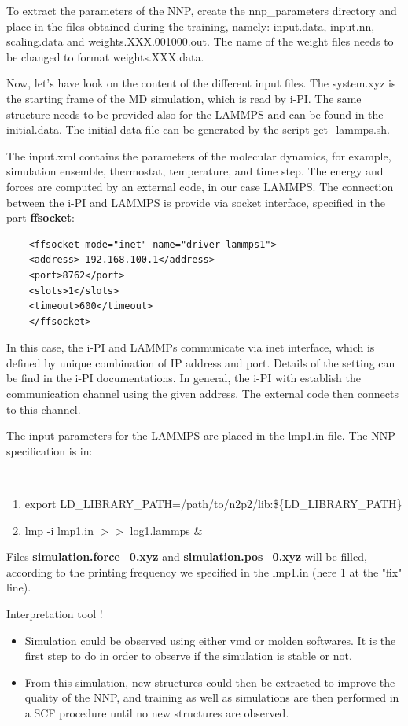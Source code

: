 \documentclass[12pt]{article}
\begin{document}
To extract the parameters of the NNP, create the nnp\_parameters directory and place in the files obtained during the training, namely: input.data, input.nn, scaling.data and weights.XXX.001000.out. The name of the weight files needs to be changed to format weights.XXX.data. 

Now, let's have look on the content of the different input files. The system.xyz is the starting frame of the MD simulation, which is read by i-PI. The same structure needs to be provided also for the LAMMPS and can be found in the initial.data. The initial data file can be generated by the script get\_lammps.sh.

The input.xml contains the parameters of the molecular dynamics, for example, simulation ensemble, thermostat, temperature, and time step. The energy and forces are computed by an external code, in our case LAMMPS. The connection between the i-PI and LAMMPS is provide via socket interface, specified in the part \textbf{ffsocket}:

\begin{verbatim}
    <ffsocket mode="inet" name="driver-lammps1">
    <address> 192.168.100.1</address>
    <port>8762</port>
    <slots>1</slots>
    <timeout>600</timeout>
    </ffsocket>
\end{verbatim}

In this case, the i-PI and LAMMPs communicate via inet interface, which is defined by unique combination of IP address and port. Details of the setting can be find in the i-PI documentations. In general, the i-PI with establish the communication channel using the given address. The external code then connects to this channel. 

The input parameters for the LAMMPS are placed in the lmp1.in file. The NNP specification is in:

\begin{verbatim}
    
\end{verbatim}

\begin{enumerate}
    \item export LD\_LIBRARY\_PATH=/path/to/n2p2/lib:\$\{LD\_LIBRARY\_PATH\}
    \item lmp -i lmp1.in $>>$ log1.lammps \&
\end{enumerate}
Files \textbf{simulation.force\_0.xyz} and \textbf{simulation.pos\_0.xyz} will be filled, according to the printing frequency we specified in the lmp1.in (here 1 at the "fix" line).
\\
\begin{mybox1}{Interpretation tool !}
\begin{itemize}
    \item Simulation could be observed using either vmd or molden softwares. It is the first step to do in order to observe if the simulation is stable or not.
    \item From this simulation, new structures could then be extracted to improve the quality of the NNP, and training as well as simulations are then performed in a SCF procedure until no new structures are observed.
\end{itemize}
\end{mybox1}
%
\end{document}
